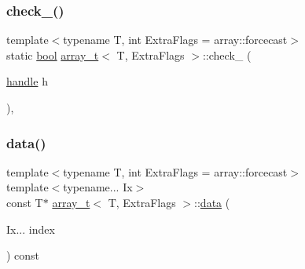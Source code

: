 \mbox{\label{classarray__t_a9cfdc02b42e11147b419b4e2a98d2591}} 
\subsubsection{\texorpdfstring{check\_()}{check\_()}}
{\footnotesize\ttfamily template$<$typename T, int Extra\+Flags = array\+::forcecast$>$ \\
static \mbox{\hyperlink{asdl_8h_af6a258d8f3ee5206d682d799316314b1}{bool}} \mbox{\hyperlink{classarray__t}{array\+\_\+t}}$<$ T, Extra\+Flags $>$\+::check\+\_\+ (\begin{DoxyParamCaption}\item[{\mbox{\hyperlink{classhandle}{handle}}}]{h }\end{DoxyParamCaption})\hspace{0.3cm}{\ttfamily [inline]}, {\ttfamily [static]}}

\mbox{\label{classarray__t_a1eae48d28e1f9dc082a1fb09b7aa1bfe}} 
\subsubsection{\texorpdfstring{data()}{data()}}
{\footnotesize\ttfamily template$<$typename T, int Extra\+Flags = array\+::forcecast$>$ \\
template$<$typename... Ix$>$ \\
const T$\ast$ \mbox{\hyperlink{classarray__t}{array\+\_\+t}}$<$ T, Extra\+Flags $>$\+::\mbox{\hyperlink{_s_d_l__opengl_8h_a2e335d56e2846b0fea47eed068b2d34a}{data}} (\begin{DoxyParamCaption}\item[{Ix...}]{index }\end{DoxyParamCaption}) const\hspace{0.3cm}{\ttfamily [inline]}}

\mbox{\label{classarray__t_a9e4404f6ad193d54f7354655823d3841}} 
